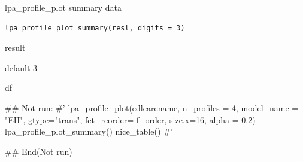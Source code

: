 \documentclass[a4paper]{book}
\begin{document}
%
\begin{Description}
lpa\_profile\_plot summary data
\end{Description}
%
\begin{Usage}
\begin{verbatim}
lpa_profile_plot_summary(resl, digits = 3)
\end{verbatim}
\end{Usage}
%
\begin{Arguments}
\begin{ldescription}
\item[\code{resl}] result

\item[\code{digits}] default 3
\end{ldescription}
\end{Arguments}
%
\begin{Value}
df
\end{Value}
%
\begin{Examples}
\begin{ExampleCode}
\#\# Not run: 
#'
lpa_profile_plot(edlcarename, n_profiles = 4, model_name = "EII", gtype="trans",
                 fct_reorder= f_order,
                 size.x=16, alpha = 0.2)%
  lpa_profile_plot_summary() %
  nice_table()
#'

## End(Not run)

\end{ExampleCode}
\end{Examples}
\end{document}

